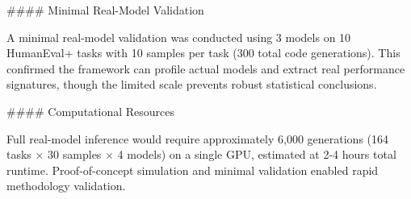 \#\#\#\# Minimal Real-Model Validation

A minimal real-model validation was conducted using 3 models on 10 HumanEval+ tasks with 10 samples per task (300 total code generations). This confirmed the framework can profile actual models and extract real performance signatures, though the limited scale prevents robust statistical conclusions.

\#\#\#\# Computational Resources

Full real-model inference would require approximately 6,000 generations (164 tasks $\times$ 30 samples $\times$ 4 models) on a single GPU, estimated at 2-4 hours total runtime. Proof-of-concept simulation and minimal validation enabled rapid methodology validation.
